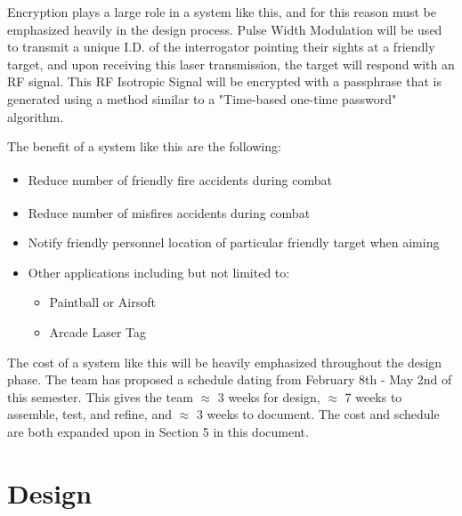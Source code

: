 \documentclass[openbib,letterpaper,10pt]{article}
\begin{document}
\begin{spacing}{1.15}
Encryption plays a large role in a system like this, and for this reason must be emphasized heavily in the design process. Pulse Width Modulation will be used to transmit a unique I.D. of the interrogator pointing their sights at a friendly target, and upon receiving this laser transmission, the target will respond with an RF signal. This RF Isotropic Signal will be encrypted with a passphrase that is generated using a method similar to a "Time-based one-time password" algorithm.

The benefit of a system like this are the following:
\begin{itemize}
	\item Reduce number of friendly fire accidents during combat \textsuperscript{\cite{Garrison}}
	\item Reduce number of misfires accidents during combat \textsuperscript{\cite{Garrison}}
	\item Notify friendly personnel location of particular friendly target when aiming
	\item Other applications including but not limited to:
	\begin{itemize}
		\item Paintball or Airsoft
		\item Arcade Laser Tag
	\end{itemize}
\end{itemize}

The cost of a system like this will be heavily emphasized throughout the design phase. The team has proposed a schedule dating from February 8th - May 2nd of this semester. This gives the team $\approx$ 3 weeks for design, $\approx$ 7 weeks to assemble, test, and refine, and $\approx$ 3 weeks to document. The cost and schedule are both expanded upon in Section 5 in this document.\\

\clearpage

\section{Design}

\end{spacing}
\end{document}
